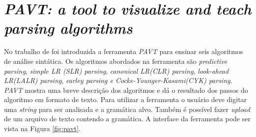 
\section{\textit{PAVT: a tool to visualize and teach parsing algorithms}}
No trabalho de \textcite{sangal2018pavt} foi introduzida a ferramenta \textit{PAVT} para ensinar seis algoritmos de análise sintática. Os algoritmos abordados na ferramenta são \textit{predictive parsing}, \textit{simple LR (SLR) parsing}, \textit{canonical LR(CLR) parsing}, \textit{look-ahead LR(LALR) parsing}, \textit{earley parsing e Cocke-Younger-Kasami(CYK) parsing}. \textit{PAVT} mostra uma breve descrição dos algoritmos e dá o resultado dos passos do algoritmo em formato de texto. Para utilizar a ferramenta o usuário deve digitar uma \textit{string} para ser analisada e a gramática alvo. Também é possível fazer \textit{upload} de um arquivo de texto contendo a gramática. A interface da ferramenta pode ser vista na Figura \ref{fig:pavt}.
\begin{figure}[ht]
    \captionsetup{width=16cm}
\end{figure}

